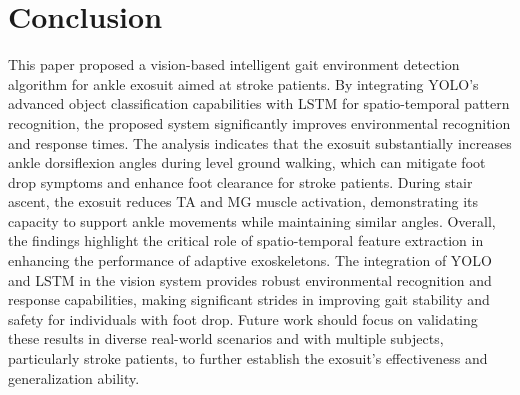 \documentclass[journal,article,submit,pdftex,moreauthors]{Definitions/mdpi}
\begin{document}
\section{Conclusion}
This paper proposed a vision-based intelligent gait environment detection algorithm for ankle exosuit aimed at stroke patients. By integrating YOLO's advanced object classification capabilities with LSTM for spatio-temporal pattern recognition, the proposed system significantly improves environmental recognition and response times. The analysis indicates that the exosuit substantially increases ankle dorsiflexion angles during level ground walking, which can mitigate foot drop symptoms and enhance foot clearance for stroke patients. During stair ascent, the exosuit reduces TA and MG muscle activation, demonstrating its capacity to support ankle movements while maintaining similar angles. Overall, the findings highlight the critical role of spatio-temporal feature extraction in enhancing the performance of adaptive exoskeletons. The integration of YOLO and LSTM in the vision system provides robust environmental recognition and response capabilities, making significant strides in improving gait stability and safety for individuals with foot drop. Future work should focus on validating these results in diverse real-world scenarios and with multiple subjects, particularly stroke patients, to further establish the exosuit's effectiveness and generalization ability. 





\vspace{6pt} 


\end{document}
